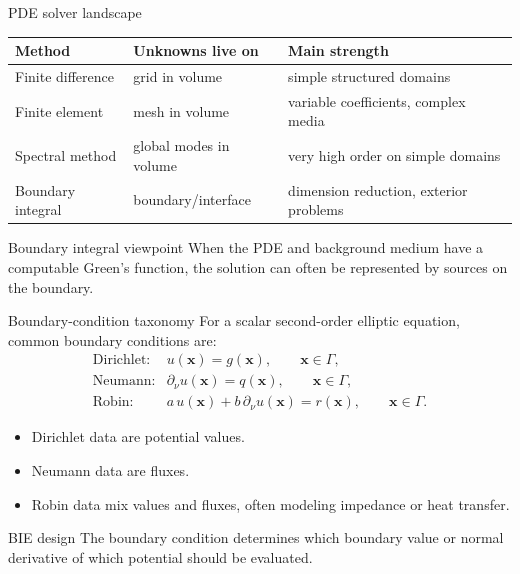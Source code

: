 \documentclass[aspectratio=169,11pt]{beamer}
\newcommand{\x}{\bm{x}}
\begin{document}
\begin{frame}{PDE solver landscape}
\small
\begin{center}
\renewcommand{\arraystretch}{1.2}
\begin{tabular}{lll}
\toprule
Method & Unknowns live on & Main strength \\
\midrule
Finite difference & grid in volume & simple structured domains \\
Finite element & mesh in volume & variable coefficients, complex media \\
Spectral method & global modes in volume & very high order on simple domains \\
Boundary integral & boundary/interface & dimension reduction, exterior problems \\
\bottomrule
\end{tabular}
\end{center}

\begin{block}{Boundary integral viewpoint}
When the PDE and background medium have a computable Green's function, the
solution can often be represented by sources on the boundary.
\end{block}
\end{frame}

\begin{frame}{Boundary-condition taxonomy}
\small
For a scalar second-order elliptic equation, common boundary conditions are:
\[
\begin{array}{ll}
\text{Dirichlet:} & u(\x)=g(\x),\qquad \x\in\Gamma,\\[0.25em]
\text{Neumann:} & \partial_\nu u(\x)=q(\x),\qquad \x\in\Gamma,\\[0.25em]
\text{Robin:} & a\,u(\x)+b\,\partial_\nu u(\x)=r(\x),\qquad \x\in\Gamma.
\end{array}
\]

\begin{itemize}
  \item Dirichlet data are potential values.
  \item Neumann data are fluxes.
  \item Robin data mix values and fluxes, often modeling impedance or heat
  transfer.
\end{itemize}

\begin{block}{BIE design}
The boundary condition determines which boundary value or normal derivative of
which potential should be evaluated.
\end{block}
\end{frame}
\end{document}
